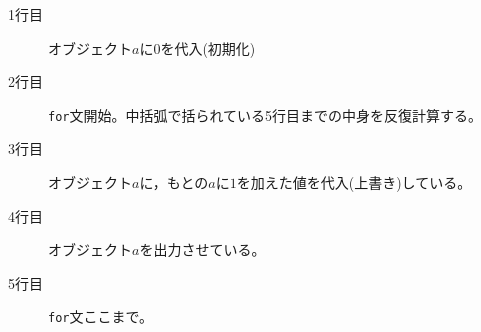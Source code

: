 \begin{description}
	\item[1行目] オブジェクト$a$に$0$を代入(初期化)
	\item[2行目] \texttt{for}文開始。中括弧で括られている5行目までの中身を反復計算する。
	\item[3行目] オブジェクト$a$に，もとの$a$に$1$を加えた値を代入(上書き)している。
	\item[4行目] オブジェクト$a$を出力させている。
	\item[5行目] \texttt{for}文ここまで。
\end{description}
